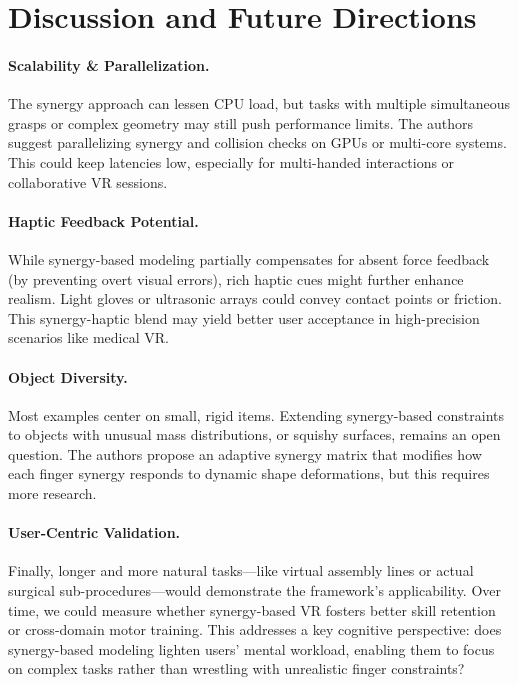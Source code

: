 \documentclass{llncs}
\begin{document}
\section*{Discussion and Future Directions}
\paragraph{Scalability \& Parallelization.}
The synergy approach can lessen CPU load, but tasks with multiple simultaneous grasps or complex geometry may still push performance limits. The authors suggest parallelizing synergy and collision checks on GPUs or multi-core systems. This could keep latencies low, especially for multi-handed interactions or collaborative VR sessions.

\paragraph{Haptic Feedback Potential.}
While synergy-based modeling partially compensates for absent force feedback (by preventing overt visual errors), rich haptic cues might further enhance realism. Light gloves or ultrasonic arrays could convey contact points or friction. This synergy-haptic blend may yield better user acceptance in high-precision scenarios like medical VR.

\paragraph{Object Diversity.}
Most examples center on small, rigid items. Extending synergy-based constraints to objects with unusual mass distributions, or squishy surfaces, remains an open question. The authors propose an adaptive synergy matrix that modifies how each finger synergy responds to dynamic shape deformations, but this requires more research.

\paragraph{User-Centric Validation.}
Finally, longer and more natural tasks---like virtual assembly lines or actual surgical sub-procedures---would demonstrate the framework's applicability. Over time, we could measure whether synergy-based VR fosters better skill retention or cross-domain motor training. This addresses a key cognitive perspective: does synergy-based modeling lighten users' mental workload, enabling them to focus on complex tasks rather than wrestling with unrealistic finger constraints?
\end{document}
